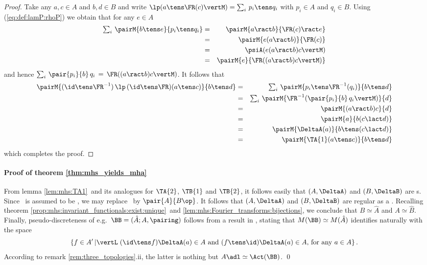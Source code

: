 \begin{proof}
Take any $a,c \in A$ and $b,d \in B$ and write
$\lp \! \left(a \tens \FR(c) \vertM\right) = \sum_i \,p_i \tens q_i$
with $p_i \in A$ and $q_i \in B$.
Using (\ref{eq:def:lamP:rhoP}) we obtain that for any $e\in A$
\begin{eqnarray*}
\textstyle \sum_i \,\pairM{b\tens e}{p_i \tens q_i}
  &=&
\pairM{a\ract b}{\FR(c) \ract e}
\\&=&
\pairM{e(a\ract b)}{\FR(c)}
\\&=&
\psiA \! \left(e(a\ract b)c\vertM\right)
\\&=&
\pairM{e}{\FR\! \left((a\ract b)c\vertM\right)}
\end{eqnarray*}
and hence $\sum_i \,\pair{p_i}{b}\, q_i \,=\, \FR\! \left((a\ract b)c\vertM\right)$.
It follows that
\begin{eqnarray*}
\pairM{(\id \tens \FR^{-1}) \,\lp\, (\id \tens \FR)(a\tens c)}{b\tens d}
  &=&
\textstyle \sum_i \, \pairM{p_i \tens \FR^{-1}(q_i)}{b\tens d}
\\&=&
\textstyle \sum_i \, \pairM{\FR^{-1}\!\left(\pair{p_i}{b} \, q_i\vertM\right)}{d}
\\&=&
\pairM{(a\ract b)c}{d}
\\&=&
\pairM{a}{b(c \lact d)}
\\&=&
\pairM{\DeltaA(a)}{b\tens (c \lact d)}
\\&=&
\pairM{\TA{1}(a \tens c)}{b\tens d}
\end{eqnarray*}
which completes the proof.
\end{proof}



\paragraph{Proof of theorem \ref{thm:mhs_yields_mha}}
From lemma \ref{lem:mhs:TA1}\ and its analogues for $\TA{2}$, $\TB{1}$ and $\TB{2}$,
it follows easily that $(A,\DeltaA)$ and $(B,\DeltaB)$ are \mha s.
Since \pairAB\ is assumed to be \mr, we may replace \pairAB\ by $\pair{A}{B\op}$.
It follows that $(A,\DeltaA)$ and $(B,\DeltaB)$ are regular as a \mha\@.
Recalling theorem \ref{prop:mhs:invariant_functionals:exist:unique}\ and
\ref{lem:mhs:Fourier_transforms:bijections},
we conclude that $B\simeq \hat{A}$ and $A\simeq \hat{B}$.
Finally, pseudo-discreteness of e.g.\ $\BB=(\hat{A};A,\pairing)$
follows from a result in \cite{Kust:corep}, stating that
$M(\BB) \simeq M(\hat{A})$ identifies naturally with the space
$$ \left\{ f \in A' \left|\vertL\right.
     (\id \tens f)\DeltaA(a) \in A  \mbox{ and } (f \tens \id)\DeltaA(a) \in A
     \mbox{, for any } a\in A \right\}. $$
According to remark \ref{rem:three_topologies}.ii,
the latter is nothing but $A\adl \simeq \Act(\BB)$.
\hfill \qed
